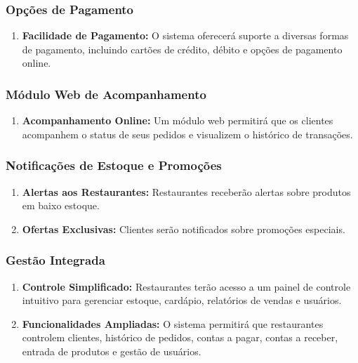 \subsubsection*{Opções de Pagamento}

\begin{enumerate}[label=5.\arabic*]
    \item \textbf{Facilidade de Pagamento:} O sistema oferecerá suporte a diversas formas de pagamento, incluindo cartões de crédito, débito e opções de pagamento online.

\end{enumerate}

\subsubsection*{Módulo Web de Acompanhamento}

\begin{enumerate}[label=6.\arabic*]
    \item \textbf{Acompanhamento Online:} Um módulo web permitirá que os clientes acompanhem o status de seus pedidos e visualizem o histórico de transações.

\end{enumerate}

\subsubsection*{Notificações de Estoque e Promoções}

\begin{enumerate}[label=7.\arabic*]
    \item \textbf{Alertas aos Restaurantes:} Restaurantes receberão alertas sobre produtos em baixo estoque.

    \item \textbf{Ofertas Exclusivas:} Clientes serão notificados sobre promoções especiais.

\end{enumerate}

\subsubsection*{Gestão Integrada}

\begin{enumerate}[label=8.\arabic*]
    \item \textbf{Controle Simplificado:} Restaurantes terão acesso a um painel de controle intuitivo para gerenciar estoque, cardápio, relatórios de vendas e usuários.

    \item \textbf{Funcionalidades Ampliadas:} O sistema permitirá que restaurantes controlem clientes, histórico de pedidos, contas a pagar, contas a receber, entrada de produtos e gestão de usuários.

\end{enumerate}




